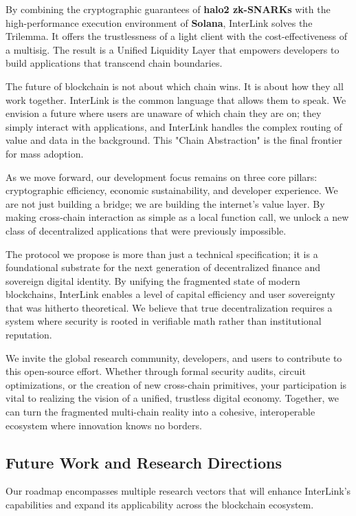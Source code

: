 \documentclass[11pt,a4paper]{article}
\begin{document}
By combining the cryptographic guarantees of \textbf{halo2 zk-SNARKs} with the high-performance execution environment of \textbf{Solana}, InterLink solves the Trilemma. It offers the trustlessness of a light client with the cost-effectiveness of a multisig. The result is a Unified Liquidity Layer that empowers developers to build applications that transcend chain boundaries.

The future of blockchain is not about which chain wins. It is about how they all work together. InterLink is the common language that allows them to speak. We envision a future where users are unaware of which chain they are on; they simply interact with applications, and InterLink handles the complex routing of value and data in the background. This "Chain Abstraction" is the final frontier for mass adoption.

As we move forward, our development focus remains on three core pillars: cryptographic efficiency, economic sustainability, and developer experience. We are not just building a bridge; we are building the internet's value layer. By making cross-chain interaction as simple as a local function call, we unlock a new class of decentralized applications that were previously impossible.

The protocol we propose is more than just a technical specification; it is a foundational substrate for the next generation of decentralized finance and sovereign digital identity. By unifying the fragmented state of modern blockchains, InterLink enables a level of capital efficiency and user sovereignty that was hitherto theoretical. We believe that true decentralization requires a system where security is rooted in verifiable math rather than institutional reputation.

We invite the global research community, developers, and users to contribute to this open-source effort. Whether through formal security audits, circuit optimizations, or the creation of new cross-chain primitives, your participation is vital to realizing the vision of a unified, trustless digital economy. Together, we can turn the fragmented multi-chain reality into a cohesive, interoperable ecosystem where innovation knows no borders.

\subsection{Future Work and Research Directions}

Our roadmap encompasses multiple research vectors that will enhance InterLink's capabilities and expand its applicability across the blockchain ecosystem.
\end{document}
